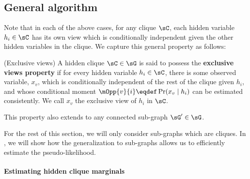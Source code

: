 \subsection{General algorithm}
\label{sec:directedGeneral}

Note that in each of the above cases,
  for any clique $\sC$, each hidden variable $h_i \in \sC$ has its own
  view which is conditionally independent given the other hidden variables in
  the clique.
We capture this general property as follows:
\begin{property}(Exclusive views)
  \label{prop:exclusive-views}
A hidden clique $\sC \in \sG$ is said to possess the \textbf{exclusive views property} if for
  every hidden variable $h_i \in \sC$, there is some observed variable,
  $x_{v}$, which is conditionally independent of the rest of the clique
  given $h_i$, and whose conditional moment $\mOpp{v}{i} \eqdef
  \Pr(x_{v} \mid h_i)$ can be estimated consistently.
We call $x_v$ the exclusive view of $h_i$ in $\sC$.

This property also extends to any connected sub-graph $\sG' \in \sG$.
\end{property}

For the rest of this section, we will only consider sub-graphs which are
  cliques. 
In , we will show how the generalization
  to sub-graphs allows us to efficiently estimate the pseudo-likelihood.


\paragraph{Estimating hidden clique marginals}

